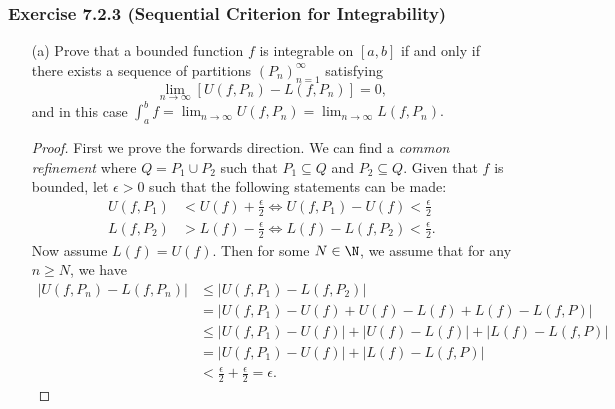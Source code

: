 \subsubsection{Exercise 7.2.3 (Sequential Criterion for Integrability)} 
\begin{enumerate}
	\item[(a)] Prove that a bounded function \( f  \) is integrable on \( [a,b]  \) if and only if there exists a sequence of partitions \( (P_{n})_{n=1}^{\infty } \) satisfying 
		\[  \lim_{ n \to \infty  }  [U(f, P_{n}) - L(f, P_{n})] = 0,  \]
		and in this case \( \int_{ a }^{ b }  f = \lim_{ n \to \infty  }  U(f, P_{n} ) = \lim_{ n \to \infty  }  L(f, P_{n}). \)
		\begin{proof}
		First we prove the forwards direction. We can find a \textit{common refinement} where \( Q = P_{1} \cup P_{2} \) such that \( P_{1} \subseteq Q  \) and \( P_{2} \subseteq Q  \). Given that \( f  \) is bounded, let \( \epsilon > 0  \) such that the following statements can be made:
		\begin{align*}
			U(f, P_1) &< U(f) + \frac{ \epsilon  }{ 2  }  \iff U(f, P_{1}) - U(f) < \frac{ \epsilon  }{ 2 } \\
			L(f, P_{2}) &> L(f) - \frac{ \epsilon  }{ 2 } \iff L(f) - L(f, P_{2}) < \frac{ \epsilon  }{ 2 } .
		\end{align*}
		Now assume \( L(f) = U(f) \). Then for some \( N \in \N  \), we assume that for any \( n \geq N  \), we have
		\begin{align*}
		    | U(f, P_{n}) - L(f, P_{n}) | &\leq | U(f, P_{1}) - L(f, P_{2}) |  \\
										  &= | U(f, P_{1}) - U(f)  +  U(f) - L(f)   +  L(f) - L(f, P ) | \\
										  &\leq | U(f, P_{1}) - U(f)  |  + | U(f) - L(f)  | + | L(f) - L(f, P ) | \\
										  &= | U(f,P_{1}) - U(f)  |  + | L(f) - L(f,P) | \\
										  &< \frac{ \epsilon  }{ 2  } + \frac{ \epsilon  }{ 2  } = \epsilon.
		\end{align*}


\end{proof}
\end{enumerate}
